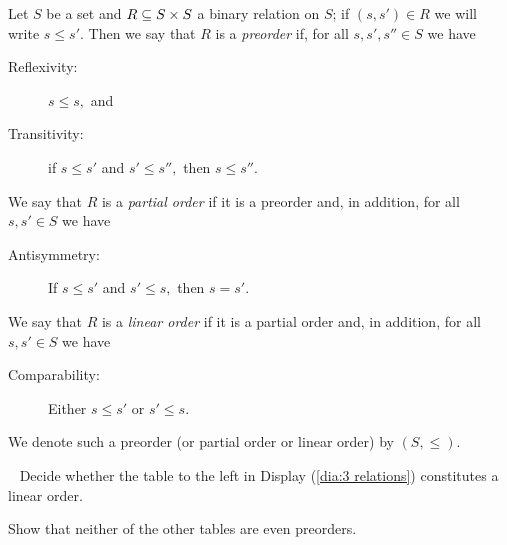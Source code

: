 \documentclass[CT4S-EN-RU]{subfiles}
\begin{document}
\begin{definitionENG}\label{def:orders}
Let $S$ be a set and $R\ss S\times S$ a binary relation on $S$; if $(s,s')\in R$ we will write $s\leq s'.$ Then we say that $R$ is a {\em preorder} if, for all $s,s',s''\in S$ we have
\begin{description}
\item[Reflexivity:] $s\leq s,$ and
\item[Transitivity:] if $s\leq s'$ and $s'\leq s'',$ then $s\leq s''.$
\end{description}
We say that $R$ is a {\em partial order} if it is a preorder and, in addition, for all $s,s'\in S$ we have
\begin{description}
\item[Antisymmetry:] If $s\leq s'$ and $s'\leq s,$ then $s=s'.$
\end{description}
We say that $R$ is a {\em linear order} if it is a partial order and, in addition, for all $s,s'\in S$ we have
\begin{description}
\item[Comparability:] Either $s\leq s'$ or $s'\leq s.$
\end{description}
We denote such a preorder (or partial order or linear order) by $(S,\leq).$
\end{definitionENG}

\begin{definitionRUS}\label{def:orders}
\end{definitionRUS}

\begin{exerciseENG}~
\sexc Decide whether the table to the left in Display (\ref{dia:3 relations}) constitutes a linear order. 
\item Show that neither of the other tables are even preorders.
\endsexc
\end{exerciseENG}

\begin{exerciseRUS}~
\end{exerciseRUS}
\end{document}
